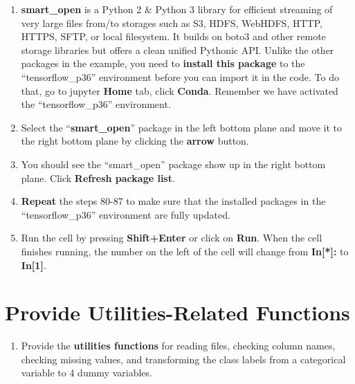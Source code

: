 \documentclass[]{book}
\providecommand{\tightlist}{%
  \setlength{\itemsep}{0pt}\setlength{\parskip}{0pt}}
\begin{document}
\begin{enumerate}
\def\labelenumi{\arabic{enumi}.}
\setcounter{enumi}{88}
\tightlist
\item
  \textbf{smart\_open} is a Python 2 \& Python 3 library for efficient streaming of very large files from/to storages such as S3, HDFS, WebHDFS, HTTP, HTTPS, SFTP, or local filesystem. It builds on boto3 and other remote storage libraries but offers a clean unified Pythonic API. Unlike the other packages in the example, you need to \textbf{install this package} to the ``tensorflow\_p36'' environment before you can import it in the code. To do that, go to jupyter \textbf{Home} tab, click \textbf{Conda}. Remember we have activated the ``tensorflow\_p36'' environment.
\item
  Select the ``\textbf{smart\_open}'' package in the left bottom plane and move it to the right bottom plane by clicking the \textbf{arrow} button.
\item
  You should see the ``smart\_open'' package show up in the right bottom plane. Click \textbf{Refresh package list}.
\item
  \textbf{Repeat} the steps 80-87 to make sure that the installed packages in the ``tensorflow\_p36'' environment are fully updated.
\item
  Run the cell by pressing \textbf{Shift+Enter} or click on \textbf{Run}. When the cell finishes running, the number on the left of the cell will change from \textbf{In{[}*{]}:} to \textbf{In{[}1{]}}.
\end{enumerate}

\hypertarget{provide-utilities-related-functions}{%
\section{Provide Utilities-Related Functions}\label{provide-utilities-related-functions}}

\begin{enumerate}
\def\labelenumi{\arabic{enumi}.}
\setcounter{enumi}{93}
\tightlist
\item
  Provide the \textbf{utilities functions} for reading files, checking column names, checking missing values, and transforming the class labels from a categorical variable to 4 dummy variables.
\end{enumerate}
\end{document}
